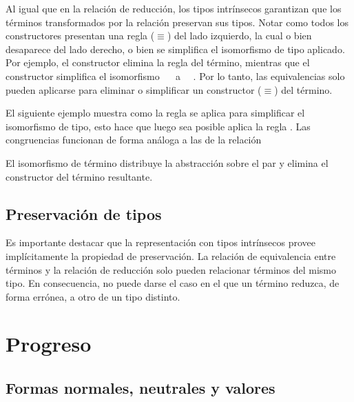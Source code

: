 Al igual que en la relación de reducción, los tipos intrínsecos garantizan que los términos transformados por la relación \type{$\_\rightleftarrows\_$} preservan sus tipos.
Notar como todos los constructores presentan una regla ($\equiv$) del lado izquierdo, la cual o bien desaparece del lado derecho, o bien se simplifica el isomorfismo de tipo aplicado.
Por ejemplo, el constructor  elimina la regla \const{[ comm ]$\equiv$\_} del término, mientras que el constructor  simplifica el isomorfismo \const{[ cong$\Rightarrow_2$}~~\const{]$\equiv$\_} a \const{[}~~\const{]$\equiv$\_}.
Por lo tanto, las equivalencias solo pueden aplicarse para eliminar o simplificar un constructor ($\equiv$) del término.

\begin{example}
	El siguiente ejemplo muestra como la regla  se aplica para simplificar el isomorfismo de tipo, esto hace que luego sea posible aplica la regla .
	Las congruencias funcionan de forma análoga a las de la relación \type{$\_\hookrightarrow\_$}
\end{example}

\begin{example}
	El isomorfismo de término  distribuye la abstracción sobre el par y elimina el constructor  del término resultante.
\end{example}

\subsection{Preservación de tipos}

Es importante destacar que la representación con tipos intrínsecos provee implícitamente la propiedad de preservación.
La relación de equivalencia entre términos \type{$\_\rightleftarrows\_$} y la relación de reducción \type{$\_\hookrightarrow\_$} solo pueden relacionar términos del mismo tipo. 
En consecuencia, no puede darse el caso en el que un término reduzca, de forma errónea, a otro de un tipo distinto.


\section{Progreso}

\subsection{Formas normales, neutrales y valores}

